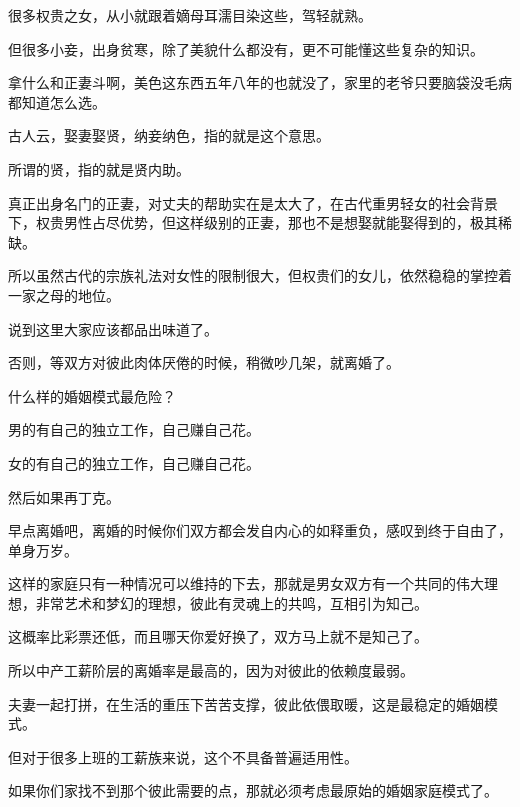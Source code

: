 \documentclass[UTF8,11pt,oneside]{ctexart}
\begin{document}
很多权贵之女，从小就跟着嫡母耳濡目染这些，驾轻就熟。

但很多小妾，出身贫寒，除了美貌什么都没有，更不可能懂这些复杂的知识。

拿什么和正妻斗啊，美色这东西五年八年的也就没了，家里的老爷只要脑袋没毛病都知道怎么选。

古人云，娶妻娶贤，纳妾纳色，指的就是这个意思。

所谓的贤，指的就是贤内助。

真正出身名门的正妻，对丈夫的帮助实在是太大了，在古代重男轻女的社会背景下，权贵男性占尽优势，但这样级别的正妻，那也不是想娶就能娶得到的，极其稀缺。

所以虽然古代的宗族礼法对女性的限制很大，但权贵们的女儿，依然稳稳的掌控着一家之母的地位。

说到这里大家应该都品出味道了。



否则，等双方对彼此肉体厌倦的时候，稍微吵几架，就离婚了。

什么样的婚姻模式最危险？

男的有自己的独立工作，自己赚自己花。

女的有自己的独立工作，自己赚自己花。

然后如果再丁克。

早点离婚吧，离婚的时候你们双方都会发自内心的如释重负，感叹到终于自由了，单身万岁。

这样的家庭只有一种情况可以维持的下去，那就是男女双方有一个共同的伟大理想，非常艺术和梦幻的理想，彼此有灵魂上的共鸣，互相引为知己。

这概率比彩票还低，而且哪天你爱好换了，双方马上就不是知己了。

所以中产工薪阶层的离婚率是最高的，因为对彼此的依赖度最弱。



夫妻一起打拼，在生活的重压下苦苦支撑，彼此依偎取暖，这是最稳定的婚姻模式。

但对于很多上班的工薪族来说，这个不具备普遍适用性。

如果你们家找不到那个彼此需要的点，那就必须考虑最原始的婚姻家庭模式了。
\end{document}
